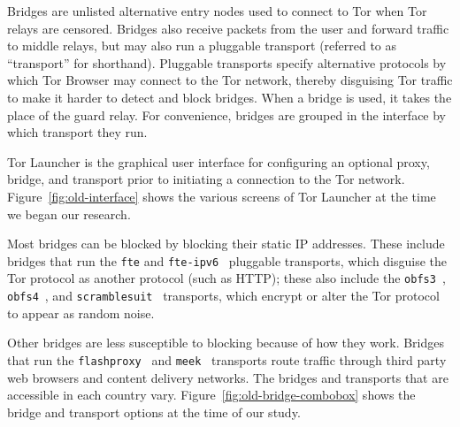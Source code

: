\documentclass[USenglish,oneside,twocolumn]{article}
\begin{document}
Bridges are unlisted alternative entry nodes used to connect to Tor when Tor relays are censored.
Bridges also receive packets from the user and forward traffic to middle relays, but may also run a pluggable transport (referred to as ``transport'' for shorthand). Pluggable transports specify alternative protocols by which Tor Browser may connect to the Tor network, thereby disguising Tor traffic to make it harder to detect and block bridges.
When a bridge is used, it takes the place of the guard relay.
For convenience, bridges are grouped in the interface by which transport they run.

Tor Launcher is the graphical user interface for configuring
an optional proxy, bridge, and transport
prior to initiating a connection to the Tor network.
Figure~\ref{fig:old-interface} shows the various screens
of Tor Launcher at the time we began our research.

Most bridges can be blocked by blocking their static IP addresses. These include bridges that run the \texttt{fte} and \texttt{fte-ipv6}~\cite{fte} pluggable transports, which disguise the Tor protocol as another protocol (such as HTTP); these also include the \texttt{obfs3}~\cite{obfs3}, \texttt{obfs4}~\cite{obfs4}, and \texttt{scramblesuit}~\cite{scramblesuit} transports, which encrypt or alter the Tor protocol to appear as random noise.

Other bridges are less susceptible to blocking because of how they work. Bridges that run the \texttt{flashproxy}~\cite{flashproxy} and \texttt{meek}~\cite{fifield2015blocking} transports route traffic through third party web browsers and content delivery networks. The bridges and transports that are accessible in each country vary. Figure~\ref{fig:old-bridge-combobox} shows the bridge and transport options at the time of our study.
\end{document}
